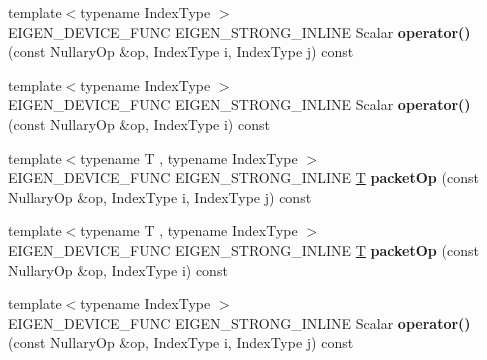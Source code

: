 \begin{DoxyCompactItemize}
\item 
\mbox{\label{struct_eigen_1_1internal_1_1nullary__wrapper_af25e8086f41c66542a620250d21ca455}} 
{\footnotesize template$<$typename Index\+Type $>$ }\\E\+I\+G\+E\+N\+\_\+\+D\+E\+V\+I\+C\+E\+\_\+\+F\+U\+NC E\+I\+G\+E\+N\+\_\+\+S\+T\+R\+O\+N\+G\+\_\+\+I\+N\+L\+I\+NE Scalar {\bfseries operator()} (const Nullary\+Op \&op, Index\+Type i, Index\+Type j) const
\item 
\mbox{\label{struct_eigen_1_1internal_1_1nullary__wrapper_afbfc90f531bf32d3da1a870cc8e65907}} 
{\footnotesize template$<$typename Index\+Type $>$ }\\E\+I\+G\+E\+N\+\_\+\+D\+E\+V\+I\+C\+E\+\_\+\+F\+U\+NC E\+I\+G\+E\+N\+\_\+\+S\+T\+R\+O\+N\+G\+\_\+\+I\+N\+L\+I\+NE Scalar {\bfseries operator()} (const Nullary\+Op \&op, Index\+Type i) const
\item 
\mbox{\label{struct_eigen_1_1internal_1_1nullary__wrapper_a7d18d3aaa762c89aa3750732914815fe}} 
{\footnotesize template$<$typename T , typename Index\+Type $>$ }\\E\+I\+G\+E\+N\+\_\+\+D\+E\+V\+I\+C\+E\+\_\+\+F\+U\+NC E\+I\+G\+E\+N\+\_\+\+S\+T\+R\+O\+N\+G\+\_\+\+I\+N\+L\+I\+NE \hyperlink{group___sparse_core___module}{T} {\bfseries packet\+Op} (const Nullary\+Op \&op, Index\+Type i, Index\+Type j) const
\item 
\mbox{\label{struct_eigen_1_1internal_1_1nullary__wrapper_a0a79344800b51bab99b99f8eb0ee3498}} 
{\footnotesize template$<$typename T , typename Index\+Type $>$ }\\E\+I\+G\+E\+N\+\_\+\+D\+E\+V\+I\+C\+E\+\_\+\+F\+U\+NC E\+I\+G\+E\+N\+\_\+\+S\+T\+R\+O\+N\+G\+\_\+\+I\+N\+L\+I\+NE \hyperlink{group___sparse_core___module}{T} {\bfseries packet\+Op} (const Nullary\+Op \&op, Index\+Type i) const
\item 
\mbox{\label{struct_eigen_1_1internal_1_1nullary__wrapper_af25e8086f41c66542a620250d21ca455}} 
{\footnotesize template$<$typename Index\+Type $>$ }\\E\+I\+G\+E\+N\+\_\+\+D\+E\+V\+I\+C\+E\+\_\+\+F\+U\+NC E\+I\+G\+E\+N\+\_\+\+S\+T\+R\+O\+N\+G\+\_\+\+I\+N\+L\+I\+NE Scalar {\bfseries operator()} (const Nullary\+Op \&op, Index\+Type i, Index\+Type j) const

\end{DoxyCompactItemize}
